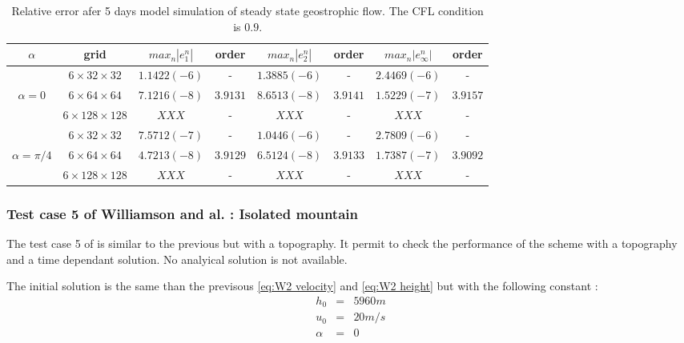 \begin{table}[ht!]
\begin{tabular}{|c|c||cc|cc|cc|}
\hline
$\alpha$ & grid & $max_n |e_1^n |$ & order & $max_n |e_2^n |$ & order &  $max_n |e_{\infty}^n |$ & order \\
\hline
\hline
              & $6 \times 32 \times 32$   & $1.1422 (-6)$ & - & $1.3885 (-6)$ & - & $2.4469 (-6)$ & - \\
$\alpha = 0$  & $6 \times 64 \times 64$   & $7.1216 (-8)$ & $3.9131$ & $8.6513 (-8)$ & $3.9141$ & $1.5229 (-7)$ & $3.9157$ \\
              & $6 \times 128 \times 128$ & $XXX$ & - & $XXX$ & - & $XXX$ & - \\
\hline
\hline
                & $6 \times 32 \times 32$   & $7.5712 (-7)$ & - & $1.0446 (-6)$ & - & $2.7809 (-6)$ & - \\
$\alpha = \pi/4$& $6 \times 64 \times 64$   & $4.7213 (-8)$ & $3.9129$ & $6.5124 (-8)$ & $3.9133$ & $1.7387 (-7)$ & $3.9092$ \\
                & $6 \times 128 \times 128$ & $XXX$ & - & $XXX$ & - & $XXX$ & - \\
\hline
\end{tabular}
\caption{Relative error afer 5 days model simulation of steady state geostrophic flow. The CFL condition is $0.9$.}
\label{tab:W2 error order}
\end{table}

\subsubsection{Test case 5 of Williamson and al. : Isolated mountain}

The test case 5 of \cite{Williamson-Drake-Hack-Jakob-Swarztrauber} is similar to the previous but with a topography. It permit to check the performance of the scheme with a topography and a time dependant solution.
No analyical solution is not available.

The initial solution is the same than the previsous \eqref{eq:W2 velocity} and \eqref{eq:W2 height} but with the following constant :
\begin{equation}
\begin{array}{rcl}
h_0 & = & 5960m \\
u_0 & = & 20 m/s \\
\alpha & = & 0 \\
\end{array}
\end{equation}

